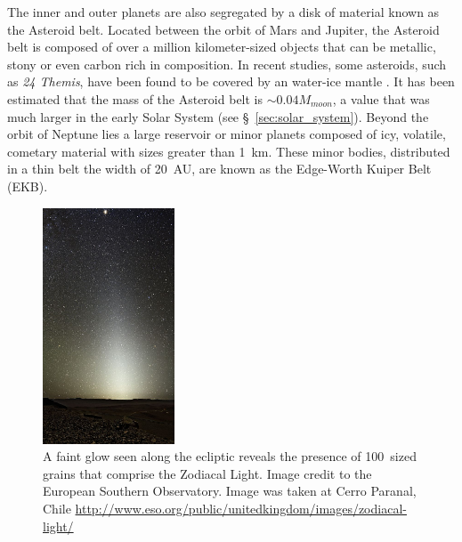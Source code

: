     
    The inner and outer planets are also segregated by a disk of material known as the Asteroid belt. Located between the orbit of Mars and Jupiter, the Asteroid belt is composed of over a million kilometer-sized objects that can be metallic, stony or even carbon rich in composition. In recent studies, some asteroids, such as \textit{24 Themis}, have been found to be covered by an water-ice mantle \citep{Campins2010}. It has been estimated that the mass of the Asteroid belt is $\sim0.04 M_{moon}$, a value that was much larger in the early Solar System (see \S~\ref{sec:solar_system}). Beyond the orbit of Neptune lies a large reservoir or minor planets composed of icy, volatile, cometary material with sizes greater than 1~km. These minor bodies, distributed in a thin belt the width of 20~AU, are known as the Edge-Worth Kuiper Belt (EKB).
    \begin{figure}
    \centering
    \includegraphics[width=0.35\textwidth]{Ch1/Zodiacal_Light_Paranal} 
    \caption[Zodiacal Light On Earth]{A faint glow seen along the ecliptic reveals the presence of 100\micron\  sized grains that comprise the Zodiacal Light. Image credit to the European Southern Observatory. Image was taken at Cerro Paranal, Chile \url{http://www.eso.org/public/unitedkingdom/images/zodiacal-light/}}
    \label{fig:ZD_ESO}
    \end{figure}
    
